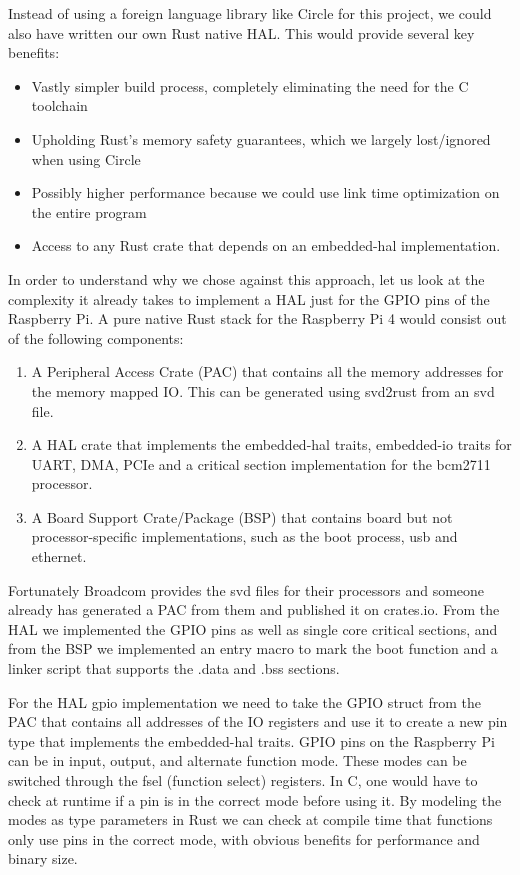 Instead of using a foreign language library like Circle for this project, we could also have written our own Rust native HAL.
This would provide several key benefits:
\begin{itemize}
    \item Vastly simpler build process, completely eliminating the need for the C toolchain
    \item Upholding Rust's memory safety guarantees, which we largely lost/ignored when using Circle
    \item Possibly higher performance because we could use link time optimization on the entire program
    \item Access to any Rust crate that depends on an embedded-hal implementation.
\end{itemize}

In order to understand why we chose against this approach, let us look at the complexity it already takes to implement a HAL just for the GPIO pins of the Raspberry Pi.
A pure native Rust stack for the Raspberry Pi 4 would consist out of the following components:
\begin{enumerate}
    \item A Peripheral Access Crate (PAC) that contains all the memory addresses for the memory mapped IO. This can be generated using svd2rust from an svd file.
    \item A HAL crate that implements the embedded-hal traits, embedded-io traits for UART, DMA, PCIe and a critical section implementation for the bcm2711 processor.
    \item A Board Support Crate/Package (BSP) that contains board but not processor-specific implementations, such as the boot process, usb and ethernet.
\end{enumerate}

Fortunately Broadcom provides the svd files for their processors and someone already has generated a PAC from them and published it on crates.io.
From the HAL we implemented the GPIO pins as well as single core critical sections, and from the BSP we implemented an entry macro to mark the boot function and a linker script that supports the .data and .bss sections.

For the HAL gpio implementation we need to take the GPIO struct from the PAC that contains all addresses of the IO registers and use it to create a new pin type that implements the embedded-hal traits.
GPIO pins on the Raspberry Pi can be in input, output, and alternate function mode. These modes can be switched through the fsel (function select) registers.
In C, one would have to check at runtime if a pin is in the correct mode before using it.
By modeling the modes as type parameters in Rust we can check at compile time that functions only use pins in the correct mode, with obvious benefits for performance and binary size.

